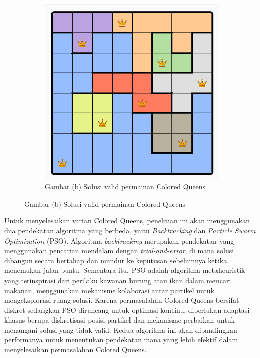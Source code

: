 \documentclass[a4paper,twoside]{article}
\begin{document}
\begin{figure}[H]
\begin{subfigure}{0.35\textwidth}
			\includegraphics[width=\linewidth]{images/Queens_solved.png}
			\caption*{Gambar \thefigure(b) Solusi valid permainan Colored Queens}
			\label{fig:Queens_solved}
		\end{subfigure}
	\end{figure}
	
	Untuk menyelesaikan varian Colored Queens, penelitian ini akan menggunakan dua pendekatan algoritma yang berbeda, yaitu \textit{Backtracking} dan \textit{Particle Swarm Optimization} (PSO). Algoritma \textit{backtracking} merupakan pendekatan yang menggunakan pencarian mendalam dengan \textit{trial-and-error}, di mana solusi dibangun secara bertahap dan mundur ke keputusan sebelumnya ketika menemukan jalan buntu. Sementara itu, PSO adalah algoritma metaheuristik yang terinspirasi dari perilaku kawanan burung atau ikan dalam mencari makanan, menggunakan mekanisme kolaborasi antar partikel untuk mengeksplorasi ruang solusi. Karena permasalahan Colored Queens bersifat diskret sedangkan PSO dirancang untuk optimasi kontinu, diperlukan adaptasi khusus berupa diskretisasi posisi partikel dan mekanisme perbaikan untuk menangani solusi yang tidak valid. Kedua algoritma ini akan dibandingkan performanya untuk menentukan pendekatan mana yang lebih efektif dalam menyelesaikan permasalahan Colored Queens.
	
\end{document}
